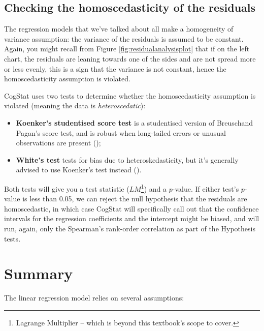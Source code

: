 \documentclass[
  11pt,
  a4paper,
  twoside,symmetric,openright]{book}
\providecommand{\tightlist}{%
  \setlength{\itemsep}{0pt}\setlength{\parskip}{0pt}}
\theoremstyle{break}
\theoremstyle{break}
\begin{document}
\subsection{Checking the homoscedasticity of the residuals}\label{regressionhomogeneity}

The regression models that we've talked about all make a homogeneity of variance assumption: the variance of the residuals is assumed to be constant. Again, you might recall from Figure \ref{fig:residualanalysisplot} that if on the left chart, the residuals are leaning towards one of the sides and are not spread more or less evenly, this is a sign that the variance is not constant, hence the homoscedasticity assumption is violated.

CogStat uses two tests to determine whether the homoscedasticity assumption is violated (meaning the data is \emph{heteroscedatic}):

\begin{itemize}
\tightlist
\item
  \textbf{Koenker's studentised score test} is a studentised version of Breuschand Pagan's score test, and is robust when long-tailed errors or unusual observations are present ();
\item
  \textbf{White's test} tests for bias due to heteroskedasticity, but it's generally advised to use Koenker's test instead ().
\end{itemize}

Both tests will give you a test statistic (\(LM\)\footnote{Lagrange Multiplier -- which is beyond this textbook's scope to cover.}) and a \(p\)-value. If either test's \(p\)-value is less than 0.05, we can reject the null hypothesis that the residuals are homoscedastic, in which case CogStat will specifically call out that the confidence intervals for the regression coefficients and the intercept might be biased, and will run, again, only the Spearman's rank-order correlation as part of the Hypothesis tests.

\section{Summary}\label{regressionassumptions}

The linear regression model relies on several assumptions:
\end{document}
